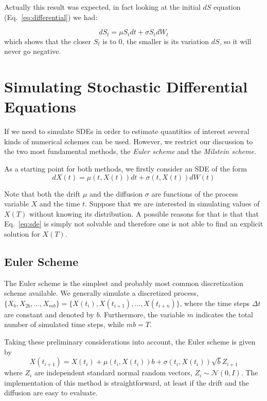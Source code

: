 Actually this result was expected, in fact looking at the initial \(dS\) equation (Eq.~\ref{eq:differential}) we had:

\begin{equation}
dS_t = \mu S_tdt + \sigma S_t dW_t
\end{equation}
which shows that the closer \(S_t\) is to 0, the smaller is its variation \(dS\), so it will never go negative.

\section {Simulating Stochastic Differential Equations}
If we need to simulate SDEs in order to estimate quantities of interest
several kinds of numerical schemes can be used. 
However, we restrict our discussion to the two most fundamental methods, the \emph{Euler scheme} and the \emph{Milstein scheme}. 

As a starting point for both methods, we firstly consider an SDE of the form
\begin{equation}
dX(t) = \mu(t, X(t))dt + \sigma(t, X(t)) dW (t)
\label{eq:sde}
\end{equation}

Note that both the drift $\mu$ and the diffusion $\sigma$ are functions of the process 
variable $X$ and the time $t$. Suppose that we are interested in simulating values of 
$X(T)$ without knowing its distribution. A possible reasons for that is that 
that Eq.~\ref{eq:sde} is simply not solvable and therefore one is not able to find an explicit solution for $X(T)$.


\subsection{Euler Scheme}
The Euler scheme is the simplest and probably most common discretization scheme 
available. We generally simulate a discretized process, 
$\{X_b, X_{2b},\ldots, X_{mb}\} = \{X(t_i), X(t_{i+1}),...,X(t_{i+n})\}$, where 
the time steps $\Delta t$ are constant and denoted by $b$. Furthermore, the 
variable $m$ indicates the total number of simulated time steps, while $mb = T$.

Taking these preliminary considerations into account, the Euler scheme is given by
\begin{equation}
X(t_{i+1}) = X(t_i) + \mu(t_i , X(t_i))b + \sigma(t_i , X(t_i))\sqrt{b}Z_{i+1}
\label{eq:euler_scheme}
\end{equation}
where $Z_i$ are independent standard normal random vectors, $Z_i ∼ \mathcal{N}(0,I)$. 
The implementation of this method is straightforward, at least if the drift and the diffusion are easy to evaluate.

